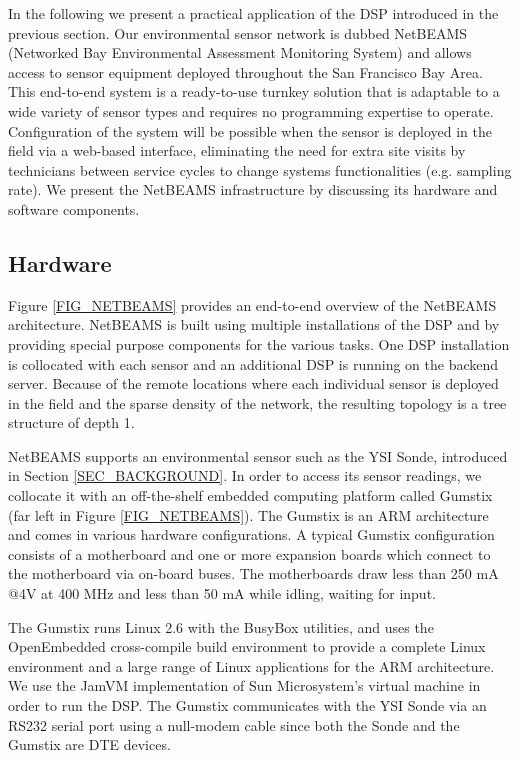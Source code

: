 \documentclass[conference]{IEEEtran}
\begin{document}
In the following we present a practical application of the DSP
introduced in the previous section. Our environmental sensor network
is dubbed NetBEAMS (Networked Bay Environmental Assessment Monitoring
System) and allows access to sensor equipment deployed throughout the
San Francisco Bay Area. This end-to-end system is a ready-to-use
turnkey solution that is adaptable to a wide variety of sensor types
and requires no programming expertise to operate. Configuration of the
system will be possible when the sensor is deployed in the field via a
web-based interface, eliminating the need for extra site visits by
technicians between service cycles to change systems functionalities
(e.g. sampling rate).  We present the NetBEAMS infrastructure by
discussing its hardware and software components.


\subsection{Hardware}

Figure \ref{FIG_NETBEAMS} provides an end-to-end overview of the
NetBEAMS architecture. NetBEAMS is built using multiple installations
of the DSP and by providing special purpose components for the various
tasks. One DSP installation is collocated with each sensor and an
additional DSP is running on the backend server. Because of the remote
locations where each individual sensor is deployed in the field and
the sparse density of the network, the resulting topology is a tree
structure of depth 1.

NetBEAMS supports an environmental sensor such as the YSI Sonde,
introduced in Section \ref{SEC_BACKGROUND}. In order to access its
sensor readings, we collocate it with an off-the-shelf embedded
computing platform called Gumstix \cite{gumstix01} (far left in Figure
\ref{FIG_NETBEAMS}).  The Gumstix is an ARM architecture and comes in
various hardware configurations.  A typical Gumstix configuration
consists of a motherboard and one or more expansion boards which
connect to the motherboard via on-board buses.  The motherboards draw
less than 250 mA @4V at 400 MHz and less than 50 mA while idling,
waiting for input.

The Gumstix runs Linux 2.6 with the BusyBox utilities, and uses the
OpenEmbedded cross-compile build environment to provide a complete
Linux environment and a large range of Linux applications for the ARM
architecture.  We use the JamVM \cite{jamvm01} implementation of Sun
Microsystem's virtual machine in order to run the DSP. The Gumstix
communicates with the YSI Sonde via an RS232 serial port using a
null-modem cable since both the Sonde and the Gumstix are DTE devices.
\end{document}
